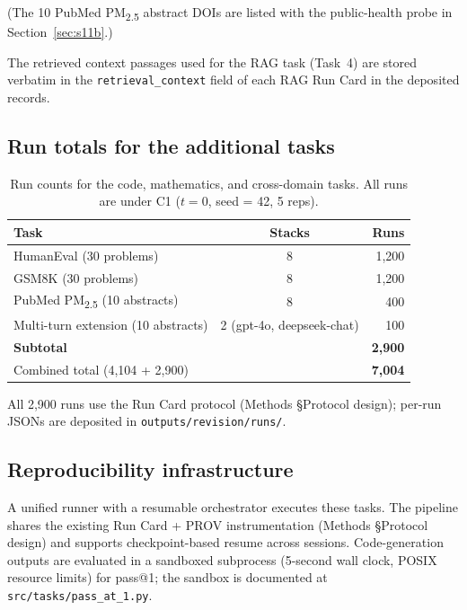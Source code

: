 \documentclass[11pt]{article}
\begin{document}
(The 10 PubMed PM\textsubscript{2.5} abstract DOIs are listed with the public-health probe in Section~\ref{sec:s11b}.)

The retrieved context passages used for the RAG task (Task~4) are stored verbatim in the \texttt{retrieval\_context} field of each RAG Run Card in the deposited records.

\subsection{Run totals for the additional tasks}

\begin{table}[H]
\centering
\caption{Run counts for the code, mathematics, and cross-domain tasks. All runs are under C1 ($t = 0$, seed = 42, 5 reps).}
\label{tab:revision-runs}
\small
\begin{tabular}{@{}lcr@{}}
\toprule
\textbf{Task} & \textbf{Stacks} & \textbf{Runs} \\
\midrule
HumanEval (30 problems)       & 8 & 1{,}200 \\
GSM8K (30 problems)           & 8 & 1{,}200 \\
PubMed PM\textsubscript{2.5} (10 abstracts) & 8 & 400 \\
Multi-turn extension (10 abstracts) & 2 (gpt-4o, deepseek-chat) & 100 \\
\midrule
\textbf{Subtotal}             &   & \textbf{2{,}900} \\
\midrule
Combined total (4{,}104 + 2{,}900) & & \textbf{7{,}004} \\
\bottomrule
\end{tabular}
\par\smallskip\raggedright\footnotesize
All 2{,}900 runs use the Run Card protocol (Methods §Protocol design); per-run JSONs are deposited in \texttt{outputs/revision/runs/}.
\end{table}

\subsection{Reproducibility infrastructure}

A unified runner with a resumable orchestrator executes these tasks. The pipeline shares the existing Run Card + PROV instrumentation (Methods §Protocol design) and supports checkpoint-based resume across sessions. Code-generation outputs are evaluated in a sandboxed subprocess (5-second wall clock, POSIX resource limits) for pass@1; the sandbox is documented at \texttt{src/tasks/pass\_at\_1.py}.
\end{document}
